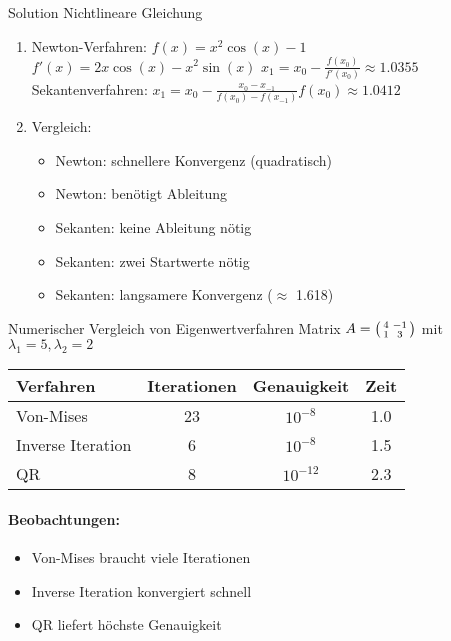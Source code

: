 \begin{KR}{Solution Nichtlineare Gleichung}
\begin{enumerate}
    \item Newton-Verfahren:
    $f(x) = x^2\cos(x) - 1$\\
    $f'(x) = 2x\cos(x) - x^2\sin(x)$
    $x_1 = x_0 - \frac{f(x_0)}{f'(x_0)} \approx 1.0355$\\
    
    Sekantenverfahren:
    $x_1 = x_0 - \frac{x_0-x_{-1}}{f(x_0)-f(x_{-1})}f(x_0) \approx 1.0412$
    
    \item Vergleich:
    \begin{itemize}
        \item Newton: schnellere Konvergenz (quadratisch)
        \item Newton: benötigt Ableitung
        \item Sekanten: keine Ableitung nötig
        \item Sekanten: zwei Startwerte nötig
        \item Sekanten: langsamere Konvergenz ($\approx$ 1.618)
    \end{itemize}
\end{enumerate}
\end{KR}

\begin{example2}{Numerischer Vergleich von Eigenwertverfahren}
\small
Matrix $A = \begin{psmallmatrix} 4 & -1 \\ 1 & 3 \end{psmallmatrix}$ mit $\lambda_1 = 5, \lambda_2 = 2$
\begin{center}
\begin{tabular}{l|c|c|c}
Verfahren & Iterationen & Genauigkeit & Zeit\\
\hline
Von-Mises & 23 & $10^{-8}$ & 1.0\\
Inverse Iteration & 6 & $10^{-8}$ & 1.5\\  
QR & 8 & $10^{-12}$ & 2.3\\
\end{tabular}
\end{center}

\paragraph{Beobachtungen:}
\begin{itemize}
    \item Von-Mises braucht viele Iterationen
    \item Inverse Iteration konvergiert schnell
    \item QR liefert höchste Genauigkeit
\end{itemize}
\end{example2}

